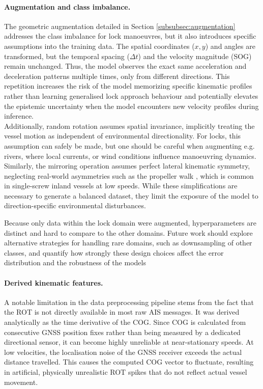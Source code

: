 \paragraph{Augmentation and class imbalance.}
The geometric augmentation detailed in Section \ref{subsubsec:augmentation} addresses the class imbalance for lock manoeuvres, but it also introduces specific assumptions into the training data. 
The spatial coordinates ($x, y$) and angles are transformed, but the temporal spacing ($\Delta t$) and the velocity magnitude (\ac{SOG}) remain unchanged. Thus, the model observes the exact same acceleration and deceleration patterns multiple times, only from different directions. This repetition increases the risk of the model memorizing specific kinematic profiles rather than learning generalised lock approach behaviour and potentially elevates the epistemic uncertainty when the model encounters new velocity profiles during inference.\\
Additionally, random rotation assumes spatial invariance, implicitly treating the vessel motion as independent of environmental directionality. For locks, this assumption can safely be made, but one should be careful when augmenting e.g. rivers, where local currents, or wind conditions influence manoeuvring dynamics.\\
Similarly, the mirroring operation assumes perfect lateral kinematic symmetry, neglecting real-world asymmetries such as the propeller walk , which is common in single-screw inland vessels at low speeds. While these simplifications are necessary to generate a balanced dataset, they limit the exposure of the model to direction-specific environmental disturbances.

Because only data within the lock domain were augmented, hyperparameters are distinct and hard to compare to the other domains. Future work should explore alternative strategies for handling rare domains, such as downsampling of other classes, and quantify how strongly these design choices affect the error distribution and the robustness of the models


\paragraph{Derived kinematic features.}
\label{subsubsec:kinematiclowvel}
A notable limitation in the data preprocessing pipeline stems from the fact that the \ac{ROT} is not directly available in most raw AIS messages. It was derived analytically as the time derivative of the \ac{COG}. Since \ac{COG} is calculated from consecutive \ac{GNSS} position fixes rather than being measured by a dedicated directional sensor, it can become highly unreliable at near-stationary speeds. At low velocities, the localisation noise of the \ac{GNSS} receiver exceeds the actual distance travelled. This causes the computed \ac{COG} vector to fluctuate, resulting in artificial, physically unrealistic ROT spikes that do not reflect actual vessel movement. 

